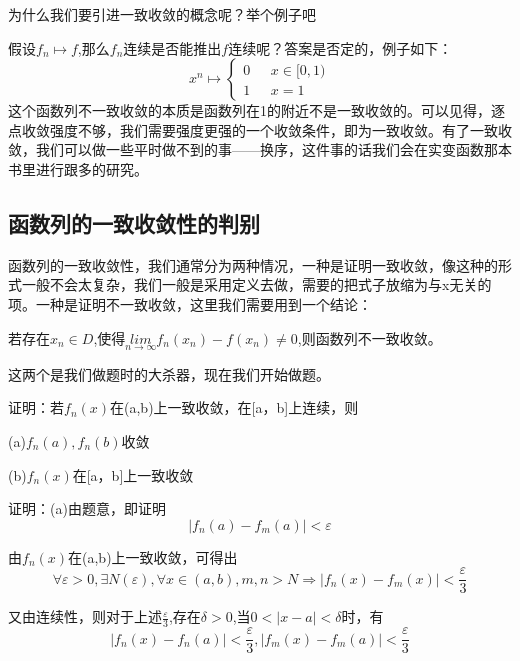 \documentclass[lang=cn,10pt]{elegantbook}
\begin{document}
为什么我们要引进一致收敛的概念呢？举个例子吧

假设$f_{n}\longmapsto f $,那么$f_{n}$连续是否能推出$f$连续呢？答案是否定的，例子如下：
\begin{equation*}
	x^{n}\longmapsto
	\begin{cases}
		0& \text{  } x\in [0,1)\\
		1& \text{  } x=1
	\end{cases}
\end{equation*}
这个函数列不一致收敛的本质是函数列在1的附近不是一致收敛的。可以见得，逐点收敛强度不够，我们需要强度更强的一个收敛条件，即为一致收敛。有了一致收敛，我们可以做一些平时做不到的事——换序，这件事的话我们会在实变函数那本书里进行跟多的研究。

\subsection{函数列的一致收敛性的判别}

函数列的一致收敛性，我们通常分为两种情况，一种是证明一致收敛，像这种的形式一般不会太复杂，我们一般是采用定义去做，需要的把式子放缩为与x无关的项。一种是证明不一致收敛，这里我们需要用到一个结论：
\begin{conclusion}
	若存在${x_{n}}\in D$,使得$\underset{n\to \infty}{lim}  f_{n}(x_{n})-f(x_{n}) \ne 0$,则函数列不一致收敛。
\end{conclusion}
这两个是我们做题时的大杀器，现在我们开始做题。
~\\

\begin{example}
证明：若$f_{n}(x)$在(a,b)上一致收敛，在[a，b]上连续，则

(a)${f_{n}(a)},{f_{n}(b)}$收敛

(b)$f_{n}(x)$在[a，b]上一致收敛
\end{example}

证明：(a)由题意，即证明
\begin{equation*}
	 |f_{n}(a)-f_{m}(a)|	<\varepsilon
\end{equation*}

由$f_{n}(x)$在(a,b)上一致收敛，可得出
\begin{equation*}
	\forall \varepsilon > 0,\exists N(\varepsilon),\forall x\in (a,b), 
	m,n>N  \Longrightarrow |f_{n}(x)-f_{m}(x)|	<\frac{\varepsilon}{3}
\end{equation*}

又由连续性，则对于上述$\frac{\varepsilon}{3}$,存在$\delta >0$,当$0<|x-a|<\delta$时，有
\begin{equation*}
	|f_{n}(x)-f_{n}(a)|	<\frac{\varepsilon}{3},
		|f_{m}(x)-f_{m}(a)|	<\frac{\varepsilon}{3}
\end{equation*}
\end{document}
